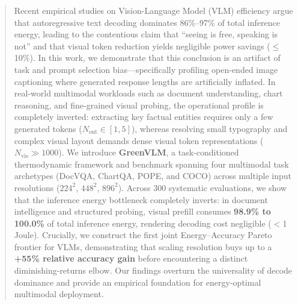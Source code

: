 \begin{abstract}
Recent empirical studies on Vision-Language Model (VLM) efficiency argue that autoregressive text decoding dominates 86\%--97\% of total inference energy, leading to the contentious claim that ``seeing is free, speaking is not'' and that visual token reduction yields negligible power savings ($\le$10\%). In this work, we demonstrate that this conclusion is an artifact of task and prompt selection bias---specifically profiling open-ended image captioning where generated response lengths are artificially inflated. In real-world multimodal workloads such as document understanding, chart reasoning, and fine-grained visual probing, the operational profile is completely inverted: extracting key factual entities requires only a few generated tokens ($N_{\text{out}} \in [1, 5]$), whereas resolving small typography and complex visual layout demands dense visual token representations ($N_{\text{vis}} \gg 1000$). We introduce \textbf{GreenVLM}, a task-conditioned thermodynamic framework and benchmark spanning four multimodal task archetypes (DocVQA, ChartQA, POPE, and COCO) across multiple input resolutions ($224^2$, $448^2$, $896^2$). Across 300 systematic evaluations, we show that the inference energy bottleneck completely inverts: in document intelligence and structured probing, visual prefill consumes \textbf{98.9\% to 100.0\%} of total inference energy, rendering decoding cost negligible ($<$1 Joule). Crucially, we construct the first joint Energy--Accuracy Pareto frontier for VLMs, demonstrating that scaling resolution buys up to a \textbf{+55\% relative accuracy gain} before encountering a distinct diminishing-returns elbow. Our findings overturn the universality of decode dominance and provide an empirical foundation for energy-optimal multimodal deployment.
\end{abstract}
